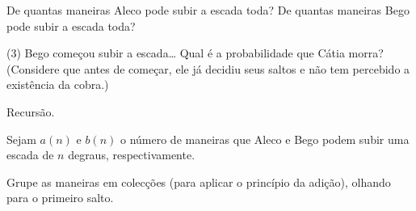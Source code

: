  De quantas maneiras Aleco pode subir a escada toda?
 De quantas maneiras Bego pode subir a escada toda?
\item{(3)} Bego começou subir a escada\dots{}
Qual é a probabilidade que Cátia morra?
(Considere que antes de começar,
ele já decidiu seus saltos e não tem percebido a existência da cobra.)

\hint
Recursão.

\hint
Sejam $a(n)$ e $b(n)$ o número de maneiras que Aleco e Bego
podem subir uma escada de $n$ degraus, respectivamente.

\hint
Grupe as maneiras em colecções (para aplicar o princípio da adição),
olhando para o primeiro salto.

